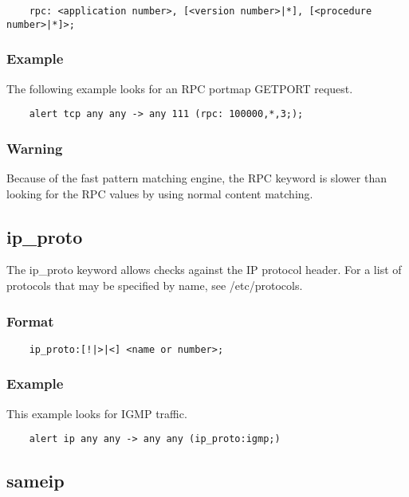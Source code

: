 \documentclass[english]{report}
\begin{document}
\begin{verbatim}
    rpc: <application number>, [<version number>|*], [<procedure number>|*]>;
\end{verbatim}

\subsubsection{Example}

The following example looks for an RPC portmap GETPORT request.

\begin{verbatim}
    alert tcp any any -> any 111 (rpc: 100000,*,3;);
\end{verbatim}

\subsubsection{Warning}

Because of the fast pattern matching engine, the RPC keyword is slower than
looking for the RPC values by using normal content matching.

\subsection{ip\_proto}

The ip\_proto keyword allows checks against the IP protocol header.  For a list
of protocols that may be specified by name, see /etc/protocols. 

\subsubsection{Format}

\begin{verbatim}
    ip_proto:[!|>|<] <name or number>;
\end{verbatim}

\subsubsection{Example}

This example looks for IGMP traffic.

\begin{verbatim}
    alert ip any any -> any any (ip_proto:igmp;)
\end{verbatim}

\subsection{sameip}
\end{document}
